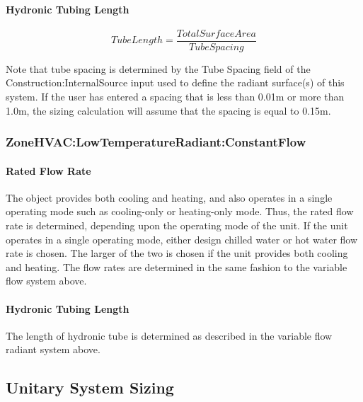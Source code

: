 \paragraph{Hydronic Tubing Length}\label{hydronic-tubing-length}

\begin{equation}
TubeLength = \frac{{TotalSurfaceArea}}{{TubeSpacing}}
\end{equation}

Note that tube spacing is determined by the Tube Spacing field of the Construction:InternalSource input used to define the radiant surface(s) of this system.  If the user has entered a spacing that is less than 0.01m or more than 1.0m, the sizing calculation will assume that the spacing is equal to 0.15m.

\subsubsection{ZoneHVAC:LowTemperatureRadiant:ConstantFlow}\label{zonehvaclowtemperatureradiantconstantflow}

\paragraph{Rated Flow Rate}\label{rated-flow-rate}

The object provides both cooling and heating, and also operates in a single operating mode such as cooling-only or heating-only mode. Thus, the rated flow rate is determined, depending upon the operating mode of the unit. If the unit operates in a single operating mode, either design chilled water or hot water flow rate is chosen. The larger of the two is chosen if the unit provides both cooling and heating. The flow rates are determined in the same fashion to the variable flow system above.

\paragraph{Hydronic Tubing Length}\label{hydronic-tubing-length-1}

The length of hydronic tube is determined as described in the variable flow radiant system above.

\subsection{Unitary System Sizing}\label{unitary-system-sizing}

